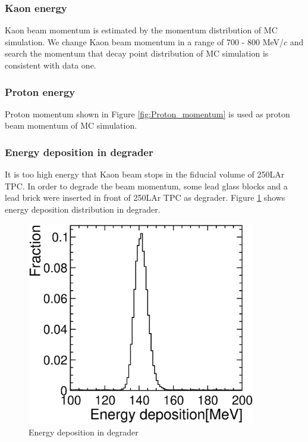 \subsubsection{Kaon energy
  \label{KaonEnergy}
}
Kaon beam momentum is estimated by the momentum distribution of MC simulation.
We change Kaon beam momentum in a range of 700 - 800 MeV/$c$ and search the momentum that decay point distribution of MC simulation is consistent with data one.

\subsubsection{Proton energy}
Proton momentum shown in Figure \ref{fig:Proton_momentum} is used as proton beam momentum of MC simulation.

\subsubsection{Energy deposition in degrader}
It is too high energy that Kaon beam stops in the fiducial volume of 250LAr TPC.
In order to degrade the beam momentum, some lead glass blocks and a lead brick were inserted in front of 250LAr TPC as degrader.
Figure \ref{energy_deposition} shows energy deposition distribution in degrader.


\begin{figure}[!htb]
  \centering
  \centering
  \includegraphics[width=10cm,clip]{./fig/energy_deposition.eps}
  \caption{Energy deposition in degrader}
  \label{energy_deposition}
\end{figure}




